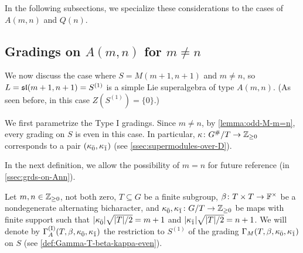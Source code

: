 In the following subsections, we specialize these considerations to the cases of $A(m,n)$ and $Q(n)$. 


\subsection{Gradings on \texorpdfstring{$A(m,n)$}{A(m,n)} for \texorpdfstring{$m \neq n$}{m different than n}}\label{ssec:grds-on-A-m-n}

We now discuss the case where $S = M(m+1, n+1)$ and $m \neq n$,  
so $L = \mathfrak{sl}(m+1, n+1) = S^{(1)}$ is a simple Lie superalgebra of type $A(m,n)$. 
(As seen before, in this case $Z(S^{(1)}) = \{ 0 \}$.)

We first parametrize the Type I gradings. 
Since $m\neq n$, by \cref{lemma:odd-M-m=n}, every grading on $S$ is even in this case. 
In particular, $\kappa\colon G^\#/T \to \mathbb{Z}_{\geq 0}$ corresponds to a pair $(\kappa_{\bar{0}}, \kappa_{\bar{1}})$ (see \cref{ssec:supermodules-over-D}). 

In the next definition, we allow the possibility of $m=n$ for future reference (in \cref{ssec:grds-on-Ann}).

\begin{defi}\label{def:A-Type-I}
    Let $m, n\in \mathbb{Z}_{\geq 0}$, not both zero, $T \subseteq G$ be a finite subgroup, $\beta\colon T\times T \to \mathbb{F}^\times$ be a nondegenerate alternating bicharacter, and $\kappa_{\bar{0}}, \kappa_{\bar{1}} \colon G/T \to \mathbb{Z}_{\geq 0}$ be maps with finite support such that $|\kappa_{\bar{0}}| \sqrt{|T|/2} = m+1$ and $|\kappa_{\bar{1}}| \sqrt{|T|/2} = n+1$. 
    We will denote by $\Gamma^{\mathrm{(I)}}_A(T, \beta, \kappa_{\bar{0}}, \kappa_{\bar{1}})$ the restriction to $S^{(1)}$ of the grading $\Gamma_M(T, \beta, \kappa_{\bar{0}}, \kappa_{\bar{1}})$ on $S$ (see \cref{def:Gamma-T-beta-kappa-even}). 
\end{defi}

